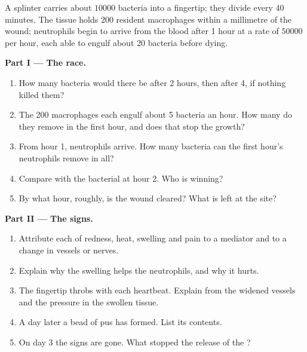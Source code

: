 \begin{problem}
\label{pb:g12:innate-immunity:1}
A splinter carries about $\num{10000}$ bacteria into a fingertip; they
divide every 40 minutes. The tissue holds 200 resident macrophages
within a millimetre of the wound; neutrophils begin to arrive from
the blood after 1 hour at a rate of $\num{50000}$ per hour, each
able to engulf about 20 bacteria before dying.

\medskip
\noindent\textbf{Part I --- The race.}
\begin{enumerate}
  \item How many bacteria would there be after 2 hours, then after 4,
        if nothing killed them?
  \item The 200 macrophages each engulf about 5 bacteria an hour. How
        many do they remove in the first hour, and does that stop the
        growth?
  \item From hour 1, neutrophils arrive. How many bacteria can the
        first hour's neutrophils remove in all?
  \item Compare with the bacterial  at hour 2. Who is
        winning?
  \item By what hour, roughly, is the wound cleared? What is left at
        the site?
\end{enumerate}

\medskip
\noindent\textbf{Part II --- The signs.}
\begin{enumerate}[resume]
  \item Attribute each of redness, heat, swelling and pain to a
        mediator and to a change in vessels or nerves.
  \item Explain why the swelling helps the neutrophils, and why it
        hurts.
  \item The fingertip throbs with each heartbeat. Explain from the
        widened vessels and the pressure in the swollen tissue.
  \item A day later a bead of pus has formed. List its contents.
  \item On day 3 the signs are gone. What stopped the release of the
        ?
\end{enumerate}


\end{problem}
